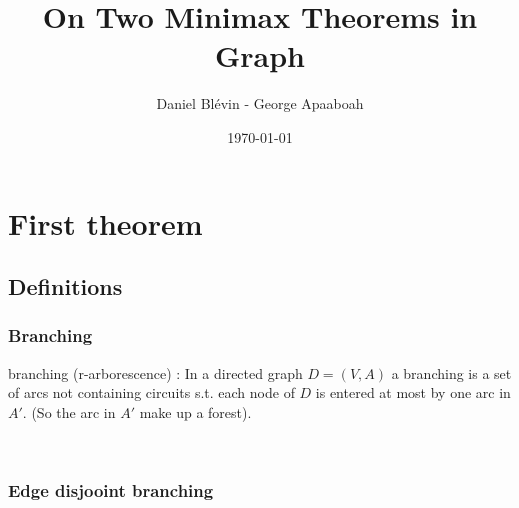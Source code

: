 \documentclass[8pt]{beamer}
\title{On Two Minimax Theorems in Graph}
\author{Daniel Blévin - George Apaaboah}
\date\today
\begin{document}
\maketitle
\begin{frame}
\tableofcontents
\end{frame}

\newtheorem{edmonds_theorem}{THEOREM}
\newtheorem{Lucchesi_and_Younger}{THEOREM}
\newtheorem{ly_lemma}{LEMMA}
\newtheorem{hypergraph}{Theorem}

\section{First theorem}
\subsection{Definitions}
\begin{frame}
\frametitle{Branching}
\begin{block}{branching (r-arborescence) :}
In a directed graph $D = (V, A)$ a branching is a set of arcs not containing 
circuits s.t. each node of $D$ is entered at most by one arc in $A'$. 
(So the arc in $A'$ make up a forest). %
\end{block}

~

\end{frame}

\begin{frame}
\frametitle{Edge disjooint branching}

\end{frame}
\end{document}
